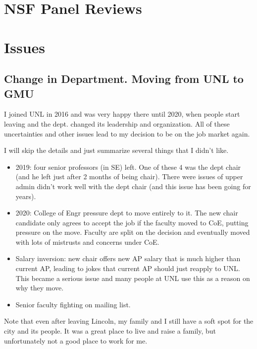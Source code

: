 \documentclass[oneside,11pt,dvipsnames]{book}
\newenvironment{commentbox}[1][]{
  \small
  \begin{mybox}
    {\small \textbf{#1}}
  }{
  \end{mybox}
}
\begin{document}


\appendix
\chapter{NSF Panel Reviews}
\chapter{Issues}


\section{Change in Department. Moving from UNL to GMU}

I joined UNL in 2016 and was very happy there until 2020, when people start leaving and the dept. changed its leadership and organization.  All of these uncertainties and other issues lead to my decision to be on the job market again.  

I will skip the details and just summarize several things that I didn't like. 

\begin{itemize}
\item 2019: four senior professors (in SE) left.  One of these 4 was the dept chair (and he left just after 2 months of being chair). There were issues of upper admin didn't work well with the dept chair (and this issue has been going for years).
\item 2020: College of Engr pressure dept to move entirely to it. The new chair candidate only agrees to accept the job if the faculty moved to CoE, putting pressure on the move. Faculty are split on the decision and eventually moved with lots of mistrusts and concerns under CoE.
\item Salary inversion:  new chair offers new AP salary that is much higher than current AP, leading to jokes that current AP should just reapply to UNL.  This became a serious issue and many people at UNL use this as a reason on why they move. 
\item Senior faculty fighting on mailing list. 

\end{itemize}


Note that even after leaving Lincoln, my family and I still have a soft spot for the city and its people.  It was a great place to live and raise a family, but unfortunately not a good place to work for me. 



\end{document}
